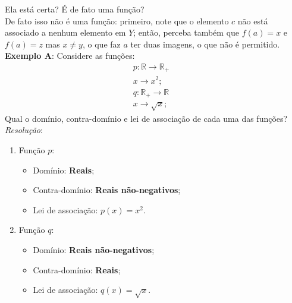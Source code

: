 \documentclass[13pt,letterpaper]{article}
\begin{document}
\begin{center}
\end{center}

Ela está certa? É de fato uma função? \\
De fato isso não é uma função: primeiro, note que o elemento $c$ não está associado a nenhum elemento em $Y$; então, perceba também que $f(a) = x$ e $f(a) = z$ mas $x \ne y$, o que faz $a$ ter duas imagens, o que não é permitido. \\

\textbf{Exemplo A}: Considere as funções:
\begin{align*}
    p: \mathbb{R} \rightarrow \mathbb{R}_+ &\\ 
    x \rightarrow x^2; \\
    q: \mathbb{R}_+ \rightarrow \mathbb{R} &\\
    x \rightarrow \sqrt{x};
\end{align*} 
Qual o domínio, contra-domínio e lei de associação de cada uma das funções? \\
\emph{Resolução}:
\begin{enumerate}
    \item Função $p$:
    \begin{itemize}
        \item Domínio: \textbf{Reais};
        \item Contra-domínio: \textbf{Reais não-negativos};
        \item Lei de associação: $p(x) = x^2$.
    \end{itemize}
    \item Função $q$:
    \begin{itemize}
        \item Domínio: \textbf{Reais não-negativos};
        \item Contra-domínio: \textbf{Reais};
        \item Lei de associação: $q(x) = \sqrt{x}$.
    \end{itemize}
\end{enumerate}
\end{document}
